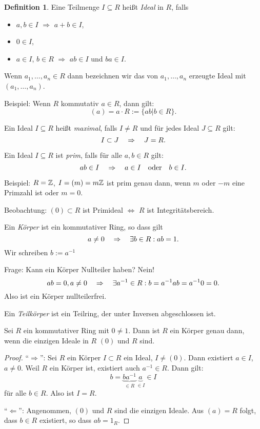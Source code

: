 \documentclass[
 a4paper,
 12pt,
 parskip=half
 ]{scrreprt}
\theoremstyle{plain}
\theoremstyle{definition}
\newtheorem{defn}[thm]{Definition}
\numberwithin{equation}{chapter}
\numberwithin{thm}{chapter}
\begin{document}
\begin{defn}
  Eine Teilmenge $I \subseteq R$ heißt \emph{Ideal} in $R$, falls
  \begin{itemize}
  \item $a,b \in I$ $\Rightarrow$ $a + b \in I$,
  \item $0 \in I$,
  \item $a \in I$, $b \in R$ $\Rightarrow$ $ab \in I$ und $ba \in I$.
  \end{itemize}

  Wenn $a_1, \ldots, a_n \in R$ dann bezeichnen wir das von $a_1, \ldots, a_n$
  erzeugte Ideal mit $(a_1, \ldots, a_n)$.

  Beispiel: Wenn $R$ kommutativ $a \in R$, dann gilt:
  \[ (a) = a \cdot R := \{ ab | b \in R \}. \]

  Ein Ideal $I \subseteq R$ heißt \emph{maximal}, falls $I \ne R$ und für jedes
  Ideal $J \subseteq R$ gilt:
  \[ I \subset J \quad \Rightarrow \quad J = R. \]

  Ein Ideal $I \subseteq R$ ist \emph{prim}, falls für alle $a,b \in R$ gilt:
  \[ ab \in I \quad \Rightarrow \quad a \in I \quad \text{oder} \quad b \in I. \]

  Beispiel: $R = \mathbb{Z}$, $I = (m) = m \mathbb{Z}$ ist prim genau dann, wenn $m$
  oder $-m$ eine Primzahl ist oder $m = 0$.

  Beobachtung: $(0) \subset R$ ist Primideal $\Leftrightarrow$ $R$ ist
  Integritätsbereich. 

  Ein \emph{Körper} ist ein kommutativer Ring, so dass gilt
  \[ a \ne 0 \quad \Rightarrow \quad \exists b \in R : ab = 1. \]
  Wir schreiben $b := a^{-1}$

  Frage: Kann ein Körper Nullteiler haben? Nein!
  \[ ab = 0, a \ne 0 \quad \Rightarrow \quad \exists a^{-1} \in R : b = a^{-1} a b = a^{-1} 0 =
    0. \]
  Also ist ein Körper nullteilerfrei.

  Ein \emph{Teilkörper} ist ein Teilring, der unter Inversen abgeschlossen ist.
\end{defn}

\begin{lem}
  Sei $R$ ein kommutativer Ring mit $0 \ne 1$. Dann ist $R$ ein Körper genau
  dann, wenn die einzigen Ideale in $R$ $(0)$ und $R$ sind.
\end{lem}

\begin{proof}
  ``$\Rightarrow$'': Sei $R$ ein Körper $I \subset R$ ein Ideal, $I \ne (0)$.
  Dann existiert $a \in I$, $a \ne 0$. Weil $R$ ein Körper ist, existiert auch
  $a^{-1} \in R$. Dann gilt:
  \[ b = \underbrace{b a^{-1}}_{\in R} \underbrace{a}_{\in I} \in I \]
  für alle $b \in R$. Also ist $I = R$.

  ``$\Leftarrow$'': Angenommen, $(0)$ und $R$ sind die einzigen Ideale. Aus $(a)
  = R$ folgt, dass $b \in R$ existiert, so dass $ab = 1_R$.
\end{proof}
\end{document}
